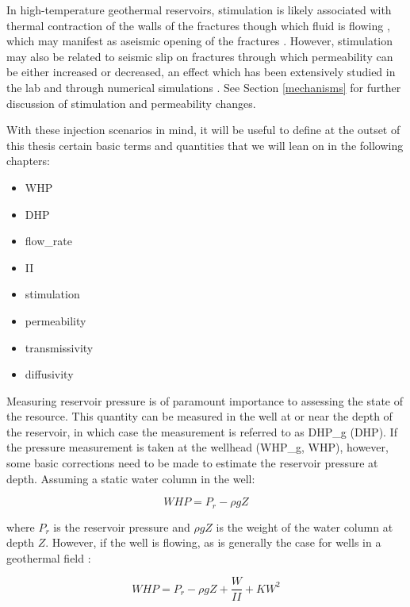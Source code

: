 \begin{itemize}
  In high-temperature geothermal reservoirs, stimulation is likely associated with thermal contraction of the walls of the fractures though which fluid is flowing \citep{grant2013thermal}, which may manifest as aseismic opening of the fractures \citep[e.g.][]{Guglielmi_2015}. However, stimulation may also be related to seismic slip on fractures through which permeability can be either increased or decreased, an effect which has been extensively studied in the lab and through numerical simulations \citep[e.g.][and references therein]{Lee_2002,Fang_2017}. See Section \ref{mechanisms} for further discussion of stimulation and permeability changes.
\end{itemize}

With these injection scenarios in mind, it will be useful to define at the outset of this thesis certain basic terms and quantities that we will lean on in the following chapters:
\begin{itemize}
  \item{\acrfull{WHP}}
  \item{\acrfull{DHP}}
  \item{\Gls{flow_rate}}
  \item{\acrfull{II}}
  \item{\Gls{stimulation}}
  \item{\Gls{permeability}}
  \item{\Gls{transmissivity}}
  \item{\Gls{diffusivity}}
\end{itemize}

Measuring reservoir pressure is of paramount importance to assessing the state of the resource. This quantity can be measured in the well at or near the depth of the reservoir, in which case the measurement is referred to as \gls{DHP_g} (\acrshort{DHP}). If the pressure measurement is taken at the wellhead (\gls{WHP_g}, \acrshort{WHP}), however, some basic corrections need to be made to estimate the reservoir pressure at depth. Assuming a static water column in the well:

\begin{equation}
WHP = P_{r} - \rho{g}Z
\end{equation}

where $P_{r}$ is the reservoir pressure and $\rho{g}Z$ is the weight of the water column at depth $Z$. However, if the well is flowing, as is generally the case for wells in a geothermal field \citep{grant2013thermal,Clearwater_2015}:

\begin{equation}
WHP = P_{r} - \rho{g}Z + \frac{W}{II} + KW^{2}
\end{equation}

